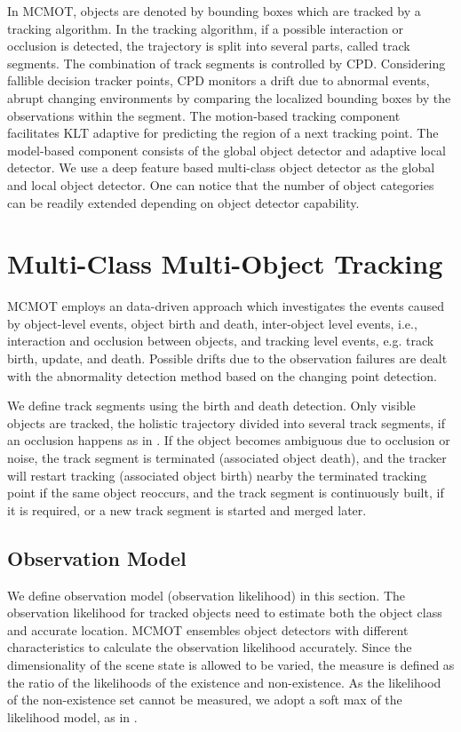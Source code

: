 \documentclass[runningheads]{llncs}
\begin{document}
In MCMOT, objects are denoted by bounding boxes which are tracked by a tracking algorithm. In the tracking algorithm, if a possible interaction or occlusion is detected, the trajectory is split into several parts, called track segments. The combination of track segments is controlled by CPD. Considering fallible decision tracker points, CPD monitors a drift due to abnormal events, abrupt changing environments by comparing the localized bounding boxes by the observations within the segment. The motion-based tracking component facilitates KLT \cite{Ref26} adaptive for predicting the region of a next tracking point. The model-based component consists of the global object detector and adaptive local detector. We use a deep feature based multi-class object detector \cite{Ref28} as the global and local object detector. One can notice that the number of object categories can be readily extended depending on object detector capability.

\section{Multi-Class Multi-Object Tracking}

MCMOT employs an data-driven approach which investigates the events caused by object-level events, object birth and death, inter-object level events, i.e., interaction and occlusion between objects, and tracking level events, e.g. track birth, update, and death. Possible drifts due to the observation failures are dealt with the abnormality detection method based on the changing point detection. 

We define track segments using the birth and death detection. Only visible objects are tracked, the holistic trajectory divided into several track segments, if an occlusion happens as in \cite{Ref16}. If the object becomes ambiguous due to occlusion or noise, the track segment is terminated (associated object death), and the tracker will restart tracking (associated object birth) nearby the terminated tracking point if the same object reoccurs, and the track segment is continuously built, if it is required, or a new track segment is started and merged later. 

\subsection{Observation Model}

We define observation model (observation likelihood)  in this section. The observation likelihood for tracked objects need to estimate both the object class and accurate location. MCMOT ensembles object detectors with different characteristics to calculate the observation likelihood accurately. Since the dimensionality of the scene state is allowed to be varied, the measure is defined as the ratio of the likelihoods of the existence and non-existence. As the likelihood of the non-existence set cannot be measured, we adopt a soft max  of the likelihood model, as in \cite{Ref18}. 
 
\end{document}
